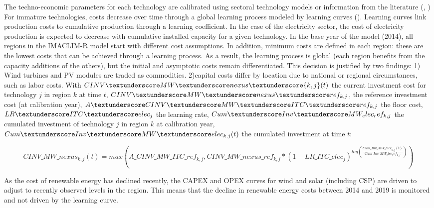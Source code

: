 The techno-economic parameters for each technology are calibrated using sectoral technology models or information from the literature (\cite{IEA2020}, \cite{IRENA2020})
For immature technologies, costs decrease over time through a global learning process modeled by learning curves (\cite{Neij2008}). Learning curves link production costs to cumulative production through a learning coefficient. In the case of the electricity sector, the cost of electricity production is expected to decrease with cumulative installed capacity for a given technology. In the base year of the model (2014), all regions in the IMACLIM-R model start with different cost assumptions. In addition, minimum costs are defined in each region: these are the lowest costs that can be achieved through a learning process. As a result, the learning process is global (each region benefits from the capacity additions of the others), but the initial and asymptotic costs remain differentiated. This decision is justified by two findings: 1) Wind turbines and PV modules are traded as commodities. 2)capital costs differ by location due to national or regional circumstances, such as labor costs. With $CINV \textunderscore MW\textunderscore nexus\textunderscore {k,j}(t)$ the current investment cost for technology $j$ in region $k$ at time $t$, $CINV\textunderscore MW\textunderscore nexus \textunderscore ref_{k,j}$, the reference investment cost (at calibration year), $A\textunderscore CINV\textunderscore MW\textunderscore ITC\textunderscore ref_{k,j}$ the floor cost,  $LR\textunderscore ITC\textunderscore elec_{j}$ the learning rate, $Cum\textunderscore Inv\textunderscore MW_ elec_ ref_{k,j}$ the cumulated investment of technology $j$ in region $k$ at calibration year, $Cum\textunderscore Inv\textunderscore MW\textunderscore elec_{k,j}(t)$ the cumulated investment at time $t$:

\begin{dmath}
    CINV\_MW\_nexus_{k,j}(t) = max(A\_CINV\_MW\_ITC\_ref_{k,j},CINV\_MW\_nexus \_ref_{k,j}*(1-LR\_ ITC\_elec_{j})^{log(\frac{Cum\_Inv\_MW\_elec_{k,j}(t)}{Cum\_Inv\_MW_elec_ ref_{k,j}})})
    \label{eqn:LR}
\end{dmath}

As the cost of renewable energy has declined recently, the CAPEX and OPEX curves for wind and solar (including CSP) are driven to adjust to recently observed levels in the region. This means that the decline in renewable energy costs between 2014 and 2019 is monitored and not driven by the learning curve.

